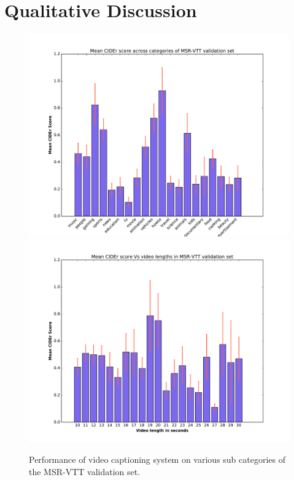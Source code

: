 \section{Qualitative Discussion}
\begin{figure}[ht]
\begin{center}
  \begin{adjustbox}{center}
  \includegraphics[width=0.55\linewidth]{images/VTTCiderCateg.pdf}%
  \includegraphics[width=0.55\linewidth]{images/VTTCiderLengths.pdf}
  \end{adjustbox}
\end{center}
\vspace*{-10mm}
\caption{Performance of video captioning system on various sub categories of the
        MSR-VTT validation set.}
\label{fig:MetVsPerplex}
\end{figure}


